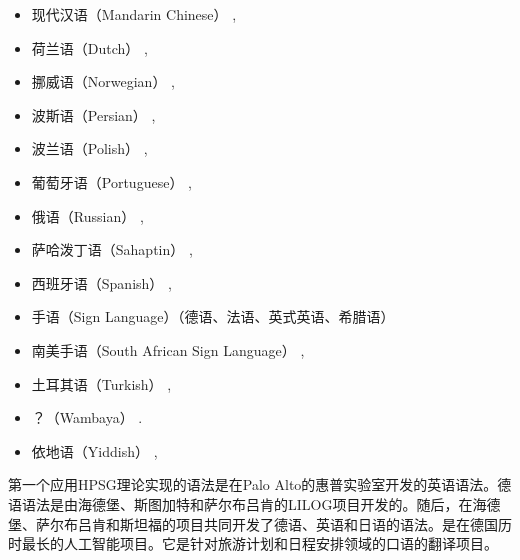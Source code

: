 \begin{itemize}
\item 现代汉语（Mandarin Chinese） 
\citep*{Liu97a,%
Ng97a,%
ML2009a,ML2013a,FSB2015a-u},
\item 荷兰语（Dutch） \citep*{NB94,BvNM2001a-u,Fokkens2011a},
\item 挪威语（Norwegian） \citep{HH2004a-u,BH2004a-u,HB2006a-u}, 
\item 波斯语（Persian） \citep{MuellerPersian,MG2010a},
\item 波兰语（Polish） \citep*{PKMM2002a-u,MMPK2003a-u}, %
\item 葡萄牙语（Portuguese） \citep{BC2008a-u,BC2008b-single-quotes,CB2010a-u},
\item 俄语（Russian） \citep{AZ2009a-u}, %
\item 萨哈泼丁语（Sahaptin） \citep{Drellishak2009a-u}, %
\item 西班牙语（Spanish）
  \citep*{PinedaMeza2005-u,PinedaMeza2005b-u,Bildhauer2008a,Marimon2013a-u%
}, 
\item 手语（Sign Language）（德语、法语、英式英语、希腊语）
\item 南美手语（South African Sign Language） \citep{Bungeroth2002a-u},
\item 土耳其语（Turkish） \citep*{FPB09a-u},
\item ？（Wambaya） \citep{Bender2008b-u,Bender2008a,Bender2010a-u}.
\item 依地语（Yiddish） \citep{MOe2011a},
\end{itemize}
第一个应用HPSG理论实现的语法是在Palo Alto的惠普实验室开发的英语语法\citep*{FPW85a,Flickinger87}。德语语法是由海德堡、斯图加特和萨尔布吕肯的LILOG项目开发的。随后，在海德堡、萨尔布吕肯和斯坦福的\verbmobil 项目共同开发了德语、英语和日语的语法。\verbmobil 是在德国历时最长的人工智能项目。它是针对旅游计划和日程安排领域的口语的翻译项目\citep{Wahlster2000a-ed-not-crossreferenced}。

